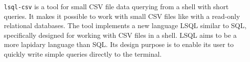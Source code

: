 \documentclass[a4paper]{article}
\def\icode#1{\texttt{#1}}
\begin{document}
\icode{lsql-csv} is a tool for small CSV file data querying from a shell with short
  queries. It makes it possible to work with small CSV files like with a read-only
  relational databases. The tool implements a new language LSQL similar to SQL,
  specifically designed for working with CSV files in a shell. 
  LSQL aims to be a more lapidary language than SQL.
  Its design purpose is to enable its user to quickly write simple queries directly
  to the terminal.
\end{document}
